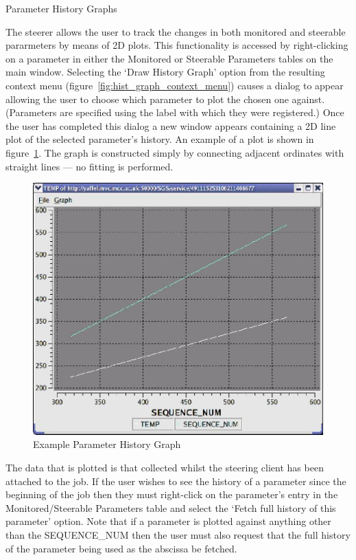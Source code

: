\documentclass[a4paper,twoside]{article}
\begin{document}

\begin{section}{Parameter History Graphs}
\label{sec:hist_graphs}

The steerer allows the user to track the changes in both monitored and
steerable pararmeters by means of 2D plots.  This functionality is
accessed by right-clicking on a parameter in either the Monitored or
Steerable Parameters tables on the main window.  Selecting the `Draw
History Graph' option from the resulting context menu
(figure~\ref{fig:hist_graph_context_menu}) causes a dialog to appear allowing
the user to choose which parameter to plot the chosen one against.
(Parameters are specified using the label with which they were
registered.)  Once the user has completed this dialog a new window
appears containing a 2D line plot of the selected parameter's
history. An example of a plot is shown in
figure~\ref{fig:eg_param_hist_plot}.  The graph is constructed simply
by connecting adjacent ordinates with straight lines --- no fitting is
performed.

\begin{figure}
\centerline{\includegraphics{hist_plot_2curves.eps}}
\caption{Example Parameter History Graph}
\label{fig:eg_param_hist_plot}
\end{figure}

The data that is plotted is that collected whilst the steering client
has been attached to the job. If the user wishes to see the history of
a parameter since the beginning of the job then they must right-click
on the parameter's entry in the Monitored/Steerable Parameters table
and select the `Fetch full history of this parameter' option.  Note
that if a parameter is plotted against anything other than the
SEQUENCE\_NUM then the user must also request that the full history of
the parameter being used as the abscissa be fetched.


\end{section}
\end{document}
